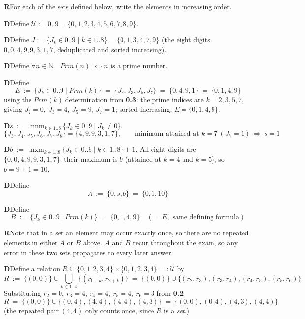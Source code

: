 \documentclass[11pt]{article}
\newcommand{\op}[1]{\mathit{#1}}
\newcommand{\mnm}{\operatorname*{mnm}} \newcommand{\mxm}{\operatorname*{mxm}}
\begin{document}
\noindent\textbf{R}\quad For each of the sets defined below, write the elements in increasing order.

\vspace{2mm}
\noindent\textbf{D}\quad Define $\mathcal{U} := 0..9 = \{0,1,2,3,4,5,6,7,8,9\}$.

\vspace{2mm}
\noindent\textbf{D}\quad Define $J := \{J_k\in0..9 \mid k\in1..8\} = \{0,1,3,4,7,9\}$ (the eight digits $0,0,4,9,9,3,1,7$, deduplicated and sorted increasing).

\vspace{2mm}
\noindent\textbf{D}\quad Define $\forall n\in\mathbb{N}\quad \op{Prm}(n) :\Leftrightarrow n\text{ is a prime number}$.

\vspace{2mm}
\noindent\textbf{D}\quad Define
\[
E \ :=\ \{J_k\in0..9 \mid \op{Prm}(k)\} \ =\ \{J_2,J_3,J_5,J_7\} \ =\ \{0,4,9,1\} \ =\ \{0,1,4,9\}
\]
using the $\op{Prm}(k)$ determination from \textbf{0.3}: the prime indices are $k=2,3,5,7$, giving $J_2=0,\ J_3=4,\ J_5=9,\ J_7=1$; sorted increasing, $E=\{0,1,4,9\}$.

\vspace{2mm}
\noindent\textbf{D}\quad $s \ :=\ \mnm_{k\in1..8}\{J_k\in0..9 \mid J_k\neq0\}$.
\[
\{J_3,J_4,J_5,J_6,J_7,J_8\} = \{4,9,9,3,1,7\},\qquad \text{minimum attained at } k=7\ (J_7=1) \ \Rightarrow\ s=1
\]

\vspace{2mm}
\noindent\textbf{D}\quad $b \ :=\ \mxm_{k\in1..8}\{J_k\in0..9 \mid k\in1..8\}+1$. All eight digits are $\{0,0,4,9,9,3,1,7\}$; their maximum is $9$ (attained at $k=4$ and $k=5$), so $b=9+1=10$.

\vspace{2mm}
\noindent\textbf{D}\quad Define
\[
A \ :=\ \{0,s,b\} \ =\ \{0,1,10\}
\]

\vspace{2mm}
\noindent\textbf{D}\quad Define
\[
B \ :=\ \{J_k\in0..9 \mid \op{Prm}(k)\} \ =\ \{0,1,4,9\}\quad(=E, \text{ same defining formula})
\]

\vspace{2mm}
\noindent\textbf{R}\quad Note that in a set an element may occur exactly once, so there are no repeated elements in either $A$ or $B$ above. $A$ and $B$ recur throughout the exam, so any error in these two sets propagates to every later answer.

\vspace{4mm}
\noindent\textbf{D}\quad Define a relation $R\subseteq\{0,1,2,3,4\}\times\{0,1,2,3,4\}=:\mathcal{U}$ by
\[
R \ :=\ \{(0,0)\} \cup \bigcup_{k\in1..4}\{(r_{1+k},r_{2+k})\} \ =\ \{(0,0)\}\cup\{(r_2,r_3),(r_3,r_4),(r_4,r_5),(r_5,r_6)\}
\]
Substituting $r_2=0,\ r_3=4,\ r_4=4,\ r_5=4,\ r_6=3$ from \textbf{0.2}:
\[
R \ =\ \{(0,0)\}\cup\{(0,4),(4,4),(4,4),(4,3)\} \ =\ \{(0,0),(0,4),(4,3),(4,4)\}
\]
(the repeated pair $(4,4)$ only counts once, since $R$ is a \emph{set}.)
\end{document}
